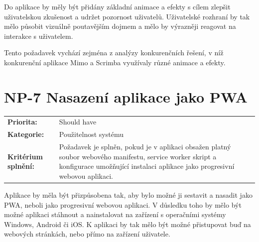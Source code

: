 Do aplikace by měly být přidány základní animace a efekty s cílem zlepšit uživatelskou zkušenost a udržet pozornost uživatelů. Uživatelské rozhraní by tak mělo působit vizuálně poutavějším dojmem a mělo by výrazněji reagovat na interakce s uživatelem.

Tento požadavek vychází zejména z analýzy konkurenčních řešení, v níž konkurenční aplikace Mimo a Scrimba využívaly různé animace a efekty.

\section{NP-7 Nasazení aplikace jako PWA}\label{sec:np-pwa-deployment}

\begin{tabularx}{\linewidth}{lX}
    \textbf{Priorita:} & Should have \\
    \textbf{Kategorie:} & Použitelnost systému \\
    \textbf{Kritérium splnění:} & Požadavek je splněn, pokud je v aplikaci obsažen platný soubor webového manifestu, service worker skript a konfigurace umožňující instalaci aplikace jako progresivní webovou aplikaci. \\
\end{tabularx}

Aplikace by měla být přizpůsobena tak, aby bylo možné ji sestavit a nasadit jako PWA, neboli jako progresivní webovou aplikaci. V důsledku toho by mělo být možné aplikaci stáhnout a nainstalovat na zařízení s operačními systémy Windows, Android či iOS. K aplikaci by tak mělo být možné přistupovat buď na webových stránkách, nebo přímo na zařízení uživatele.
